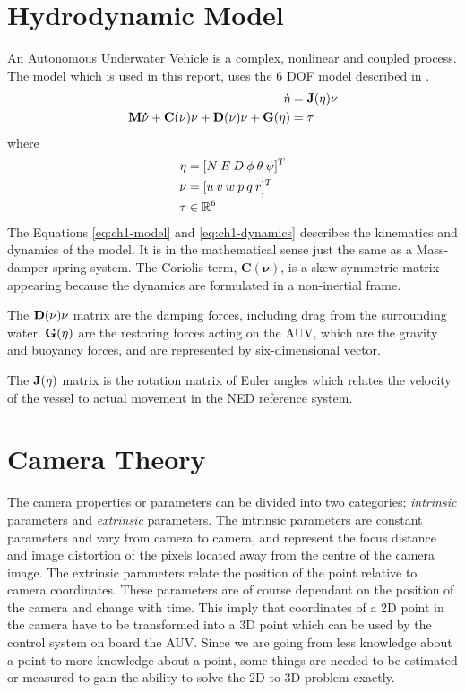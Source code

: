 \section{Hydrodynamic Model}
	\label{sec:ch1-model}
	An Autonomous Underwater Vehicle is a complex, nonlinear and coupled process. The model which is used in this
	report, uses the 6 DOF model described in \cite{fossen}.
	\begin{align}
			\label{eq:ch1-model}
			\mathbf{\dot{\eta}} &= \mathbf{J}(\mathbf{\eta}) \mathbf{\nu} \\
			\label{eq:ch1-dynamics}
			\mathbf{M}\mathbf{\dot{\nu}} + \mathbf{C}(\mathbf{\nu})\mathbf{\nu} + \mathbf{D}(\mathbf{\nu})\mathbf{\nu} + \mathbf{G}(\mathbf{\eta}) &= \mathbf{\tau} 
	\end{align}
	where 
	\begin{align*}
		\mathbf{\eta} &= [N \: E \: D \: \phi \: \theta \: \psi ]^T \\
		\mathbf{\nu}  &= [u \: v \: w \: p \: q \: r]^T \\
		\mathbf{\tau} & \in \mathbb{R}^6
	\end{align*}
	The Equations \eqref{eq:ch1-model} and \eqref{eq:ch1-dynamics} describes the kinematics and dynamics of the
	model. It is in the mathematical sense just the same as a Mass-damper-spring system. The Coriolis term,
	$\mathbf{C}(\mathbf{\nu})$, is a skew-symmetric matrix appearing because the dynamics are formulated in a
	non-inertial frame.

	The $\mathbf{D}(\mathbf{\nu})\mathbf{\nu}$ matrix are the damping forces, including drag from the surrounding water. $\mathbf{G}(\mathbf{\eta})$
	are the restoring forces acting on the AUV, which are the gravity and buoyancy forces, and are represented by
	six-dimensional vector.
	
	The $\mathbf{J}(\mathbf{\eta})$ matrix is the rotation matrix of Euler angles which relates the velocity of the 
	vessel to actual movement in the NED reference system.


\section{Camera Theory}
	\label{ch1-cameramodel}
	The camera properties or parameters can be divided into two categories; \textit{intrinsic} parameters and
	\textit{extrinsic} parameters. The intrinsic parameters are constant parameters and vary from camera to
	camera, and represent the focus distance and image distortion of the pixels located away from the centre of the
	camera image. 
	The extrinsic parameters relate the position of the point relative to camera coordinates. 
	These parameters are of course dependant on the position of the camera and change with time. 	This imply that 
	coordinates of a 2D point in the camera have to be transformed into a 3D point which can be used 
	by the control system on board the AUV. Since 
	we are going from less knowledge about a point to more knowledge about a point, some things are needed to be 
	estimated or measured to gain the ability to solve the 2D to 3D problem exactly.\cite{robotbok}

